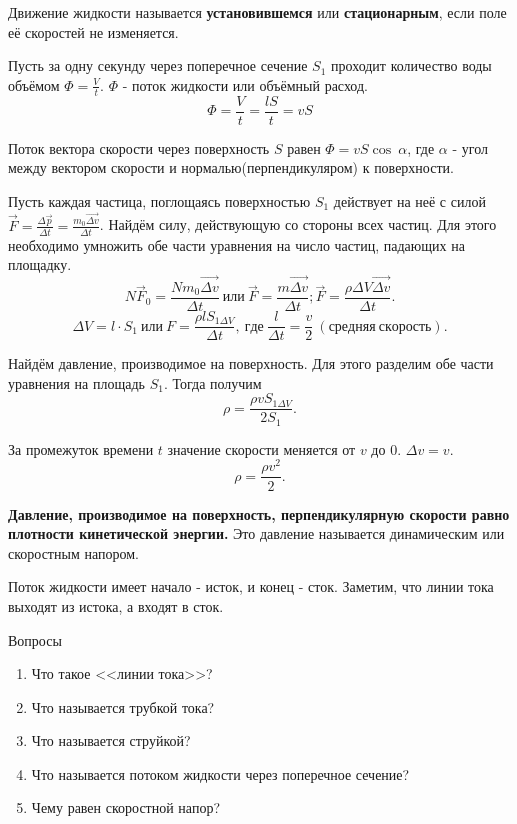 \documentclass[a5paper, 10pt]{diss_4}
\renewcommand{\'}{\,'}
\begin{document}
  Движение жидкости называется \textbf{установившемся} или
\textbf{стационарным}, если поле её скоростей не изменяется.

  Пусть за одну секунду через поперечное сечение $S_1$ проходит количество
воды объёмом $\Phi=\frac{V}{t}$. $\Phi$ - поток жидкости или объёмный расход.
\[
\Phi=\frac{V}{t}=\frac{lS}{t}=vS
\]

  Поток вектора скорости через поверхность $S$ равен $\Phi=vS\cos\ \alpha$, где
 $\alpha$ - угол между вектором скорости и нормалью(перпендикуляром) к
поверхности.

  Пусть каждая частица, поглощаясь поверхностью $S_1$ действует на неё с силой
 $\vec{F}=\frac{\Delta\vec{p}}{\Delta t}=\frac{m_0\vec{\Delta v}}{\Delta t}$.
Найдём силу, действующую со стороны всех частиц. Для этого необходимо
умножить обе части уравнения на число частиц, падающих на площадку.
\[
N\vec{F}_0=\frac{Nm_0\vec{\Delta v}}{\Delta t}\ или \
\vec{F}=\frac{m\vec{\Delta v}}{\Delta t};
\vec{F}=\frac{\rho\Delta V\vec{\Delta v}}{\Delta t}.
\]
\[
\Delta V=l\cdot S_1\ или \
F=\frac{\rho l S_{1\Delta V}}{\Delta t},\ где\
\frac{l}{\Delta t}=\frac{v}{2}\ (средняя\ скорость).
\]

  Найдём давление, производимое на поверхность. Для этого разделим обе части
уравнения на площадь $S_1$. Тогда получим
\[
\rho=\frac{\rho v S_{1\Delta V}}{2S_1}.
\]

  За промежуток времени $t$ значение скорости меняется от $v$ до $0$. $\Delta
v= v$.
\[
\rho=\frac{\rho v^2}{2}.
\]

  \textbf{Давление, производимое на поверхность, перпендикулярную скорости равно
плотности кинетической энергии.} Это давление называется динамическим или
скоростным напором.

  Поток жидкости имеет начало - исток, и конец - сток. Заметим, что линии тока
выходят из истока, а входят в сток.

\begin{center}
   Вопросы
\end{center}
\begin{enumerate}
\item Что такое <<линии тока>>?
\item Что называется трубкой тока?
\item Что называется струйкой?
\item Что называется потоком жидкости через поперечное сечение?
\item Чему равен скоростной напор?
\end{enumerate}
\end{document}
